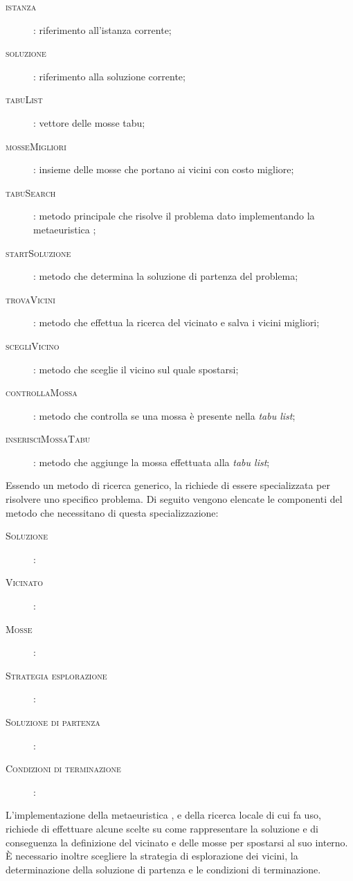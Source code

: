 \begin{description}
\begin{description}
		\item[\textsc{istanza}]: riferimento all'istanza corrente;
		\item[\textsc{soluzione}]: riferimento alla soluzione corrente;
		\item[\textsc{tabuList}]: vettore delle mosse tabu;
		\item[\textsc{mosseMigliori}]: insieme delle mosse che portano ai vicini con costo migliore;
		\item[\textsc{tabuSearch}]: metodo principale che risolve il problema dato implementando la metaeuristica \tabu;
		\item[\textsc{startSoluzione}]: metodo che determina la soluzione di partenza del problema;
		\item[\textsc{trovaVicini}]: metodo che effettua la ricerca del vicinato e salva i vicini migliori;
		\item[\textsc{scegliVicino}]: metodo che sceglie il vicino sul quale spostarsi;
		\item[\textsc{controllaMossa}]: metodo che controlla se una mossa è presente nella \emph{tabu list};
		\item[\textsc{inserisciMossaTabu}]: metodo che aggiunge la mossa effettuata alla \emph{tabu list};
	\end{description}
\end{description}

Essendo un metodo di ricerca generico, la \tabu richiede di essere specializzata per risolvere uno specifico problema.
Di seguito vengono elencate le componenti del metodo che necessitano di questa specializzazione:

\begin{description}
\item[\textsc{Soluzione}]:
\item[\textsc{Vicinato}]:
\item[\textsc{Mosse}]:
\item[\textsc{Strategia esplorazione}]:
\item[\textsc{Soluzione di partenza}]:
\item[\textsc{Condizioni di terminazione}]:
\end{description}

L'implementazione della metaeuristica \tabu, e della ricerca locale di cui fa uso, richiede di effettuare alcune scelte su come rappresentare la soluzione e di conseguenza la definizione del vicinato e delle mosse per spostarsi al suo interno. È necessario inoltre scegliere la strategia di esplorazione dei vicini, la determinazione della soluzione di partenza e le condizioni di terminazione.

